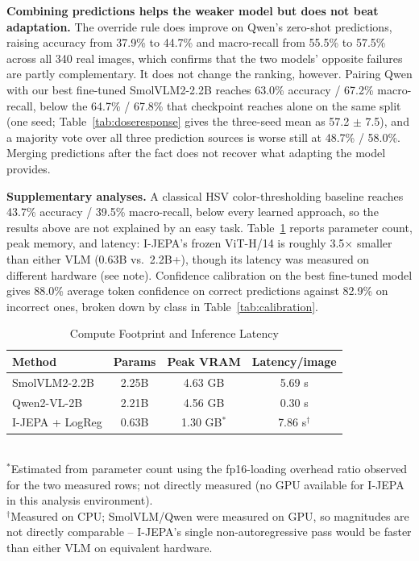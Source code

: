 \documentclass[conference]{IEEEtran}
\begin{document}
\textbf{Combining predictions helps the weaker model but does not beat adaptation.} The override rule does improve on Qwen's zero-shot predictions, raising accuracy from 37.9\% to 44.7\% and macro-recall from 55.5\% to 57.5\% across all 340 real images, which confirms that the two models' opposite failures are partly complementary. It does not change the ranking, however. Pairing Qwen with our best fine-tuned SmolVLM2-2.2B reaches 63.0\% accuracy / 67.2\% macro-recall, below the 64.7\% / 67.8\% that checkpoint reaches alone on the same split (one seed; Table~\ref{tab:doseresponse} gives the three-seed mean as 57.2 $\pm$ 7.5), and a majority vote over all three prediction sources is worse still at 48.7\% / 58.0\%. Merging predictions after the fact does not recover what adapting the model provides.

\textbf{Supplementary analyses.} A classical HSV color-thresholding baseline reaches 43.7\% accuracy / 39.5\% macro-recall, below every learned approach, so the results above are not explained by an easy task. Table~\ref{tab:compute} reports parameter count, peak memory, and latency: I-JEPA's frozen ViT-H/14 is roughly 3.5$\times$ smaller than either VLM (0.63B vs.\ 2.2B+), though its latency was measured on different hardware (see note). Confidence calibration on the best fine-tuned model gives 88.0\% average token confidence on correct predictions against 82.9\% on incorrect ones, broken down by class in Table~\ref{tab:calibration}.

\begin{table}[t]
\caption{Compute Footprint and Inference Latency}
\label{tab:compute}
\centering
\begin{tabular}{lccc}
\toprule
\textbf{Method} & \textbf{Params} & \textbf{Peak VRAM} & \textbf{Latency/image} \\
\midrule
SmolVLM2-2.2B & 2.25B & 4.63 GB & 5.69 s \\
Qwen2-VL-2B & 2.21B & 4.56 GB & 0.30 s \\
I-JEPA + LogReg & 0.63B & 1.30 GB$^{*}$ & 7.86 s$^{\dagger}$ \\
\bottomrule
\end{tabular}
\\[2pt]
{\footnotesize $^{*}$Estimated from parameter count using the fp16-loading overhead ratio observed for the two measured rows; not directly measured (no GPU available for I-JEPA in this analysis environment).}\\
{\footnotesize $^{\dagger}$Measured on CPU; SmolVLM/Qwen were measured on GPU, so magnitudes are not directly comparable -- I-JEPA's single non-autoregressive pass would be faster than either VLM on equivalent hardware.}
\end{table}
\end{document}
